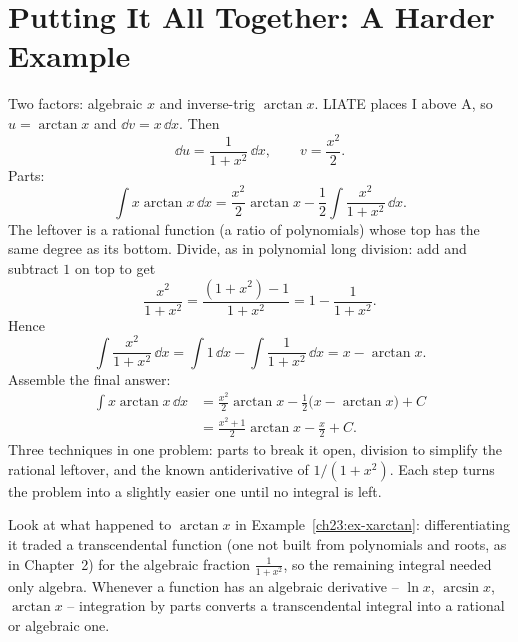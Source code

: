 \section{Putting It All Together: A Harder Example}
\label{ch23:harder}

\begin{example}
\label{ch23:ex-xarctan}
Two factors: algebraic $x$ and inverse-trig $\arctan x$. LIATE places I above A, so
$u = \arctan x$ and $\dd v = x\,\dd x$. Then
\[
\dd u = \frac{1}{1+x^2}\,\dd x, \qquad v = \frac{x^2}{2}.
\]
Parts:
\[
\int x\arctan x\,\dd x
= \frac{x^2}{2}\arctan x - \frac12\int \frac{x^2}{1+x^2}\,\dd x.
\]
The leftover is a rational function (a ratio of polynomials) whose top has the
same degree as its bottom. Divide, as in polynomial long division: add and
subtract $1$ on top to get
\[
\frac{x^2}{1+x^2} = \frac{(1+x^2) - 1}{1+x^2} = 1 - \frac{1}{1+x^2}.
\]
Hence
\[
\int \frac{x^2}{1+x^2}\,\dd x = \int 1\,\dd x - \int\frac{1}{1+x^2}\,\dd x
= x - \arctan x.
\]
Assemble the final answer:
\begin{align*}
\int x\arctan x\,\dd x
&= \frac{x^2}{2}\arctan x - \frac12\big(x - \arctan x\big) + C\\
&= \frac{x^2+1}{2}\arctan x - \frac{x}{2} + C.
\end{align*}
Three techniques in one problem: parts to break it open, division to
simplify the rational leftover, and the known antiderivative of $1/(1+x^2)$.
Each step turns the problem into a slightly easier one until no integral is left.
\end{example}

\begin{aestheticbox}
Look at what happened to $\arctan x$ in Example~\ref{ch23:ex-xarctan}: differentiating it
traded a transcendental function (one not built from polynomials and roots, as in
Chapter~2) for the algebraic fraction $\frac{1}{1+x^2}$, so the remaining integral
needed only algebra. Whenever a function has an
algebraic derivative -- $\ln x$, $\arcsin x$, $\arctan x$ -- integration by parts converts a
transcendental integral into a rational or algebraic one.
\end{aestheticbox}

